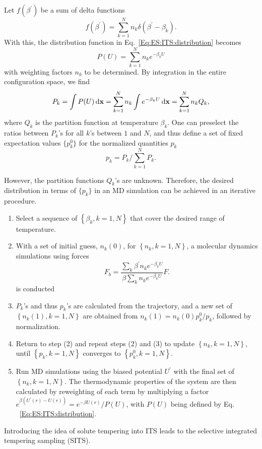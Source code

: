 Let $f(\beta^\prime)$ be a sum of delta functions
\begin{equation}
	f\left(\beta^{\prime}\right)=\sum_{k=1}^N n_k \delta\left(\beta^{\prime}-\beta_k\right) .
\end{equation}
With this, the distribution function in Eq.~\ref{Eq:ES:ITS:distribution} becomes
\begin{equation}
	P(U)=\sum_{k=1}^N n_k  e^{-\beta_k U}
\end{equation}
with weighting factors $n_k$ to be determined. By integration in  the entire configuration space, we find
\begin{equation}
	P_k=\int P(U) \mathop{}\!\mathrm{d} \mathbf{x} = \sum_{k=1}^N n_k \int e^{-\beta_k  U}\mathop{}\!\mathrm{d} \mathbf{x}=\sum_{k=1}^N n_k Q_k,
\end{equation}
where $Q_k$ is the partition function at temperature $\beta_k$. One can preselect the ratios between $P_k$'s for all $k$'s between $1$ and $N$, and thus define a set of fixed expectation values $\{p_k^0\}$ for the normalized quantities $p_k$
\begin{equation}
	p_k=P_k/\sum_{k=1}^N P_k.
\end{equation}

However, the partition functions $Q_k$'s are unknown. Therefore, the desired distribution in terms of $\{p_k\}$ in an MD simulation can be achieved in an iterative procedure.
\begin{enumerate}
	\item Select a sequence of $\left\{\beta_k, k=1, N\right\}$ that cover the desired range of temperature.
	\item With a set of initial guess, $n_k(0)$, for $\left\{n_k, k=1, N\right\}$, a molecular dynamics simulations using forces 
	$$
	F_b=\frac{\sum_k \beta^{\prime} n_k e^{-\beta_k U}}{\beta \sum_k n_k e^{-\beta_k U}} F .
	$$
	is conducted
	\item $P_k$'s and thus $p_k$'s are calculated from the trajectory, and a new set of $\left\{n_k(1), k=1, N\right\}$ are obtained from $n_k(1)=n_k(0) p_k^0 / p_k$, followed by normalization.
	\item Return to step (2) and repeat steps (2) and (3) to update $\left\{n_k, k=1, N\right\}$, until $\left\{p_k, k=1, N\right\}$ converges to $\left\{p_k^0, k=1, N\right\}$.
	\item Run MD simulations using the biased potential $U^\prime$ with the final set of $\left\{n_k, k=1, N\right\}$. The thermodynamic properties of the system are then calculated by reweighting of each term by multiplying a factor $e^{\beta\left(U^{\prime}(r)-U(r)\right)}=e^{-\beta U(r)} / P(U)$, with $P(U)$ being defined by Eq. ~\ref{Eq:ES:ITS:distribution}.
\end{enumerate}

Introducing the idea of solute tempering into ITS leads to the selective integrated tempering sampling (SITS).\cite{YangJCP2009}
